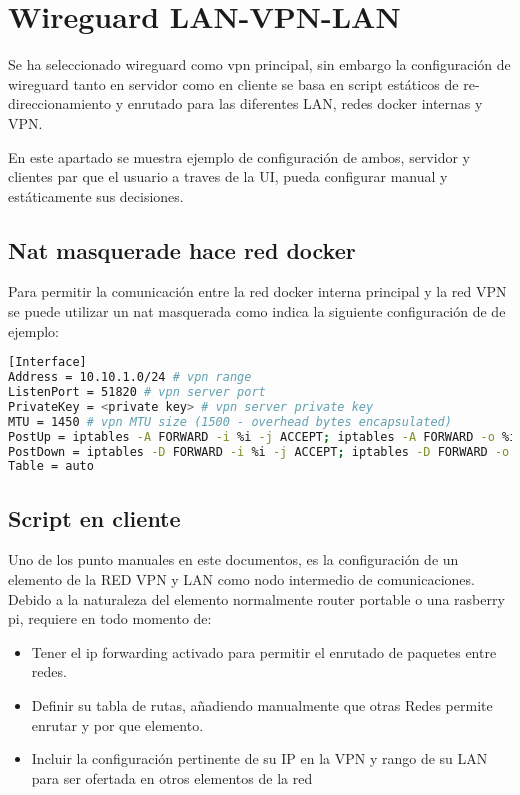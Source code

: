 \section{Wireguard LAN-VPN-LAN}
Se ha seleccionado wireguard como vpn principal, sin embargo la configuración de wireguard tanto en servidor como en cliente se basa en script estáticos de re-direccionamiento y enrutado para las diferentes LAN, redes docker internas y VPN.

En este apartado se muestra ejemplo de configuración de ambos, servidor y clientes par que el usuario a traves de la UI, pueda configurar manual y estáticamente sus decisiones.

\subsection{Nat masquerade hace red docker}
Para permitir la comunicación entre la red docker interna principal y la red VPN se puede utilizar un nat masquerada como indica la siguiente configuración de de ejemplo:

\begin{lstlisting}[language=bash, caption={Ejemplo de configuracion servidor Nat masquerade}, label={lst:wireguard_server_nat} ]
[Interface]
Address = 10.10.1.0/24 # vpn range
ListenPort = 51820 # vpn server port
PrivateKey = <private key> # vpn server private key
MTU = 1450 # vpn MTU size (1500 - overhead bytes encapsulated)
PostUp = iptables -A FORWARD -i %i -j ACCEPT; iptables -A FORWARD -o %i -j ACCEPT; iptables -t nat -A POSTROUTING -s 10.10.1.0/24 -o eth0 -j MASQUERADE; iptables -A INPUT -p udp -m udp --dport 21820 -j ACCEPT
PostDown = iptables -D FORWARD -i %i -j ACCEPT; iptables -D FORWARD -o %i -j ACCEPT; iptables -t nat -D POSTROUTING -s 10.10.1.0/24 -o eth0 -j MASQUERADE; iptables -D INPUT -p udp -m udp --dport 21820 -j ACCEPT
Table = auto
\end{lstlisting}

\subsection{Script en cliente}
Uno de los  punto manuales en este documentos, es la configuración de un elemento de la RED VPN y LAN como nodo intermedio de comunicaciones.
Debido a la naturaleza del elemento normalmente router portable o una rasberry pi, requiere en todo momento de:
\begin{itemize}
    \item Tener el ip forwarding activado para permitir el enrutado de paquetes entre redes.
    \item Definir su tabla de rutas, añadiendo manualmente que otras Redes permite enrutar y por que elemento. 
    \item Incluir la configuración pertinente de su IP en la VPN y rango de su LAN para ser ofertada en otros elementos de la red
\end{itemize}

